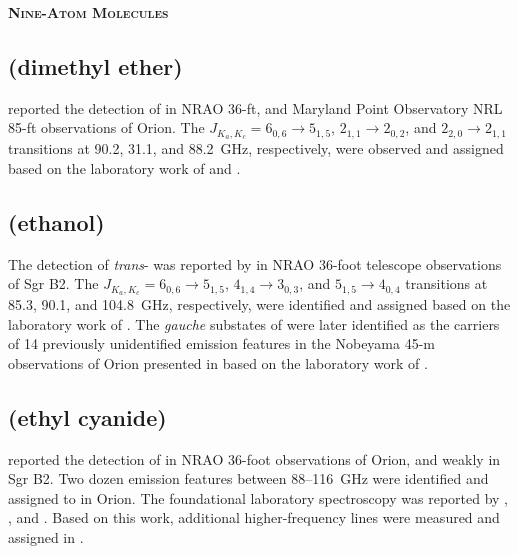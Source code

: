 \documentclass[twocolumn]{aastex631}
\begin{document}
    
    \begin{center}
        \large
        \textsc{\textbf{Nine-Atom Molecules}}
        \label{9atoms}
        \normalsize
    \end{center}      
    
    \subsection{ (dimethyl ether)}
	\label{CH3OCH3}
	
	\citet{Snyder:1974op} reported the detection of  in NRAO 36-ft, and Maryland Point Observatory NRL 85-ft observations of Orion.  The $J_{K_a,K_c} = 6_{0,6}\rightarrow5_{1,5}$, $2_{1,1}\rightarrow2_{0,2}$, and $2_{2,0}\rightarrow2_{1,1}$ transitions at 90.2, 31.1, and 88.2~GHz, respectively, were observed and assigned based on the laboratory work of \citet{Kasai:1959ed} and \citet{Blukis:1963hm}.
	
	\subsection{ (ethanol)}
	\label{CH3CH2OH}
	
	The detection of \emph{trans}- was reported by \citet{Zuckerman:1975jx} in NRAO 36-foot telescope observations of Sgr B2.  The $J_{K_a,K_c} = 6_{0,6}\rightarrow5_{1,5}$, $4_{1,4}\rightarrow3_{0,3}$, and $5_{1,5}\rightarrow4_{0,4}$ transitions at 85.3, 90.1, and 104.8~GHz, respectively, were identified and assigned based on the laboratory work of \citet{Takano:1968kz}.  The \emph{gauche} substates of  were later identified as the carriers of 14 previously unidentified emission features in the Nobeyama 45-m observations of Orion presented in \citet{Ohishi:1988co} based on the laboratory work of \citet{Pearson:1997ki}.
	
	\subsection{ (ethyl cyanide)}
	\label{CH3CH2CN}
	
	\citet{Johnson:1977ky} reported the detection of  in NRAO 36-foot observations of Orion, and weakly in Sgr B2.  Two dozen emission features between 88--116~GHz were identified and assigned to  in Orion.  The foundational laboratory spectroscopy was reported by \citet{Heise:1974et}, \citet{Mader:1974ko}, and \citet{Laurie:1959eq}.  Based on this work, additional higher-frequency lines were measured and assigned in \citet{Johnson:1977ky}.
	
\end{document}
